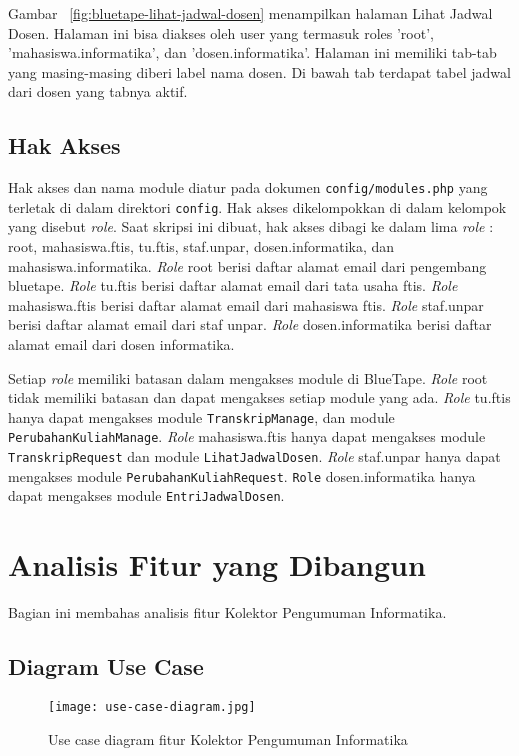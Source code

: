 	Gambar~ \ref{fig:bluetape-lihat-jadwal-dosen} menampilkan halaman Lihat Jadwal Dosen. Halaman ini bisa diakses oleh user yang termasuk roles 'root', 'mahasiswa.informatika', dan 'dosen.informatika'. Halaman ini memiliki tab-tab yang masing-masing diberi label nama dosen. Di bawah tab terdapat tabel jadwal dari dosen yang tabnya aktif.

\subsection{Hak Akses}
	Hak akses dan nama module diatur pada dokumen \texttt{config/modules.php} yang terletak di dalam direktori \texttt{config}. Hak akses dikelompokkan di dalam kelompok yang disebut \textit{role}. Saat skripsi ini dibuat, hak akses dibagi ke dalam lima \textit{role} : root, mahasiswa.ftis, tu.ftis, staf.unpar, dosen.informatika, dan mahasiswa.informatika. \textit{Role} root berisi daftar alamat email dari pengembang bluetape. \textit{Role} tu.ftis berisi daftar alamat email dari tata usaha ftis. \textit{Role} mahasiswa.ftis berisi daftar alamat email dari mahasiswa ftis. \textit{Role} staf.unpar berisi daftar alamat email dari staf unpar. \textit{Role} dosen.informatika berisi daftar alamat email dari dosen informatika.

	Setiap \textit{role} memiliki batasan dalam mengakses module di BlueTape. \textit{Role} root tidak memiliki batasan dan dapat mengakses setiap module yang ada. \textit{Role} tu.ftis hanya dapat mengakses module \texttt{TranskripManage}, dan module \texttt{PerubahanKuliahManage}. \textit{Role} mahasiswa.ftis hanya dapat mengakses module \texttt{TranskripRequest} dan module \texttt{LihatJadwalDosen}. \textit{Role} staf.unpar hanya dapat mengakses module \texttt{PerubahanKuliahRequest}. \texttt{Role} dosen.informatika hanya dapat mengakses module \texttt{EntriJadwalDosen}.

\section{Analisis Fitur yang Dibangun}
\label{sec:analisisYangDibangun}
	Bagian ini membahas analisis fitur Kolektor Pengumuman Informatika.

\subsection{Diagram Use Case}
\begin{figure}[H]
	\centering  
	\texttt{[image: use-case-diagram.jpg]}  
	\caption[Use case diagram fitur Kolektor Pengumuman Informatika]{Use case diagram fitur Kolektor Pengumuman Informatika} 
	\label{fig:use-case-diagram} 
\end{figure}

